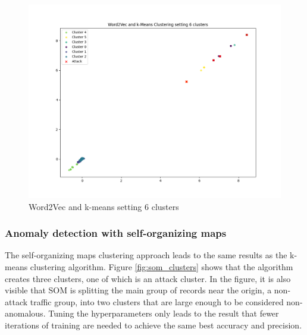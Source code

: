 \begin{figure}[H]
	\caption{Word2Vec and k-means setting 6 clusters}
	\label{fig:kmeans_clusters_6}
	\sffamily\footnotesize
	\includegraphics[width=1\textwidth]{pic/k_means_6.png}
	\unitlength=0.75mm
	\linethickness{0.4pt}
\end{figure}

\subsubsection{Anomaly detection with self-organizing maps}
The self-organizing maps clustering approach leads to the same results as the k-means clustering algorithm. Figure \ref{fig:som_clusters} shows that the algorithm creates three clusters, one of which is an attack cluster. In the figure, it is also visible that SOM is splitting the main group of records near the origin, a non-attack traffic group, into two clusters that are large enough to be considered non-anomalous. Tuning the hyperparameters only leads to the result that fewer iterations of training are needed to achieve the same best accuracy and precision. 



